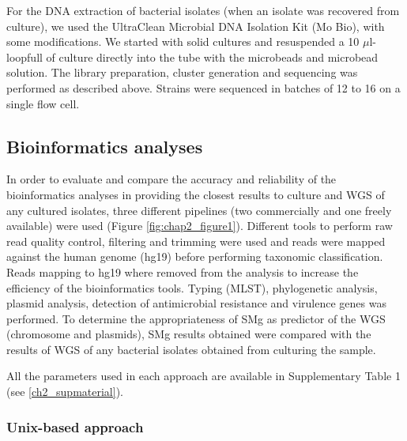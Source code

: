 For the DNA extraction of bacterial isolates (when an isolate was recovered from culture), we used the UltraClean Microbial DNA Isolation Kit (Mo Bio), with some modifications. 
We started with solid cultures and resuspended a 10 $\mu$l-loopfull of culture directly into the tube with the microbeads and microbead solution. 
The library preparation, cluster generation and sequencing was performed as described above. 
Strains were sequenced in batches of 12 to 16 on a single flow cell.

\subsection{Bioinformatics analyses} \label{ssec:sample_bioinformatics}

In order to evaluate and compare the accuracy and reliability of the bioinformatics analyses in providing the closest results to culture and \ac{WGS} of any cultured isolates, three different pipelines (two commercially and one freely available) were used (Figure \ref{fig:chap2_figure1}).
Different tools to perform raw read quality control, filtering and trimming were used and reads were mapped against the human genome (hg19) before performing taxonomic classification. 
Reads mapping to hg19 where removed from the analysis to increase the efficiency of the bioinformatics tools. 
Typing (MLST), phylogenetic analysis, plasmid analysis, detection of antimicrobial resistance and virulence genes was performed. 
To determine the appropriateness of \ac{SMg} as predictor of the \ac{WGS} (chromosome and plasmids), \ac{SMg} results obtained were compared with the results of \ac{WGS} of any bacterial isolates obtained from culturing the sample.

All the parameters used in each approach are available in Supplementary Table 1 (see \ref{ch2_supmaterial}).

\subsubsection{Unix-based approach}

